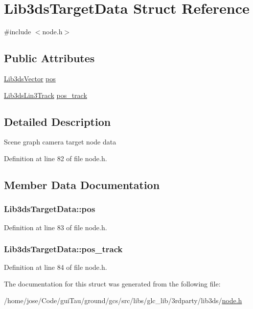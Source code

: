 \hypertarget{struct_lib3ds_target_data}{\section{Lib3ds\-Target\-Data Struct Reference}
\label{struct_lib3ds_target_data}
}


{\ttfamily \#include $<$node.\-h$>$}

\subsection*{Public Attributes}
\begin{DoxyCompactItemize}
\item 
\hyperlink{group__vector_ga6ac1c3b3ef15381ebf6baf264d658dcf}{Lib3ds\-Vector} \hyperlink{struct_lib3ds_target_data_adab4096e90d7d670741b5aad63569b5c}{pos}
\item 
\hyperlink{struct_lib3ds_lin3_track}{Lib3ds\-Lin3\-Track} \hyperlink{struct_lib3ds_target_data_aa64c02a94e4b8883f2bc3aad844b3938}{pos\-\_\-track}
\end{DoxyCompactItemize}


\subsection{Detailed Description}
Scene graph camera target node data 

Definition at line 82 of file node.\-h.



\subsection{Member Data Documentation}
\hypertarget{struct_lib3ds_target_data_adab4096e90d7d670741b5aad63569b5c}{
\subsubsection[{pos}]{ Lib3ds\-Target\-Data\-::pos}}\label{struct_lib3ds_target_data_adab4096e90d7d670741b5aad63569b5c}


Definition at line 83 of file node.\-h.

\hypertarget{struct_lib3ds_target_data_aa64c02a94e4b8883f2bc3aad844b3938}{
\subsubsection[{pos\-\_\-track}]{ Lib3ds\-Target\-Data\-::pos\-\_\-track}}\label{struct_lib3ds_target_data_aa64c02a94e4b8883f2bc3aad844b3938}


Definition at line 84 of file node.\-h.



The documentation for this struct was generated from the following file\-:\begin{DoxyCompactItemize}
\item 
/home/jose/\-Code/gui\-Tau/ground/gcs/src/libs/glc\-\_\-lib/3rdparty/lib3ds/\hyperlink{node_8h}{node.\-h}\end{DoxyCompactItemize}
